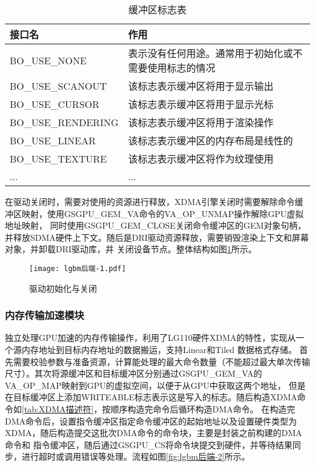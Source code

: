\begin{table}[h]  
  \centering
  \caption{缓冲区标志表}
  \label{tab:缓冲区标志表}
  \begin{tabular}{ll}
    \toprule
    接口名  & 作用\\
    \midrule
    BO\_USE\_NONE & 表示没有任何用途。通常用于初始化或不需要使用标志的情况 \\
    BO\_USE\_SCANOUT & 该标志表示缓冲区将用于显示输出 \\
    BO\_USE\_CURSOR & 该标志表示缓冲区将用于显示光标 \\
    BO\_USE\_RENDERING & 该标志表示缓冲区将用于渲染操作 \\
    BO\_USE\_LINEAR & 该标志表示缓冲区的内存布局是线性的 \\
    BO\_USE\_TEXTURE & 该标志表示缓冲区将作为纹理使用 \\
    ... & ... \\
    \bottomrule
  \end{tabular}
  \note{}
\end{table}

在驱动关闭时，需要对使用的资源进行释放，XDMA引擎关闭时需要解除命令缓冲区映射，使用GSGPU\_GEM\_VA命令的VA\_OP\_UNMAP操作解除GPU虚拟地址映射​，
同时使用GSGPU\_GEM\_CLOSE关闭命令缓冲区的GEM对象句柄，并释放SDMA硬件上下文​。随后是DRI驱动资源释放，需要销毁渲染上下文和屏幕对象，并卸载DRI驱动库，并
关闭设备节点。整体结构如图\ref{fig:lgbm后端-1}所示。

\begin{figure}[h]
  \centering
  \texttt{[image: lgbm后端-1.pdf]}
  \caption{驱动初始化与关闭}
  \label{fig:lgbm后端-1}
\end{figure}  

\subsubsection{内存传输加速模块}

独立处理GPU加速的内存传输操作，利用了LG110硬件XDMA的特性，实现从一个源内存地址到目标内存地址的数据搬运，支持Linear和Tiled 数据格式存储。
首先需要校验参数与准备资源，计算能处理的最大命令数量（不能超过最大单次传输尺寸）。其次将源缓冲区和目标缓冲区分别通过GSGPU\_GEM\_VA的VA\_OP\_MAP映射到GPU的虚拟空间，以便于从GPU中获取这两个地址，
但是在目标缓冲区上添加WRITEABLE标志表示这是写入的标志。随后构造XDMA命令如\ref{tab:XDMA描述符}，按顺序构造完命令后循环构造DMA命令。
在构造完DMA命令后，设置指令缓冲区指定命令缓冲区的起始地址以及设置硬件类型为XDMA，随后构造提交这批次DMA命令的命令块，主要是封装之前构建的DMA命令和
指令缓冲区，随后通过GSGPU\_CS将命令块提交到硬件，并等待结果同步，进行超时或调用错误等处理。流程如图\ref{fig:lgbm后端-2}所示。


